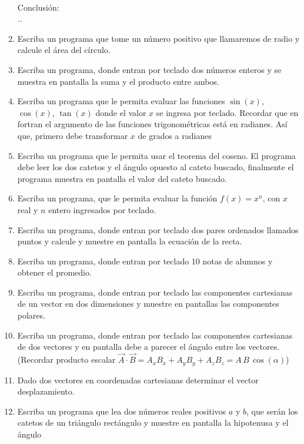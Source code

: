 \documentclass[11pt]{exam}
\begin{document}
\begin{enumerate}
\begin{minipage}{5cm}
\end{minipage}
\\

Conclusi\'on: \dotfill \\
..\dotfill
\item 
Escriba un programa que tome un  n\'umero positivo que llamaremos de radio  y calcule el \'area del c\'irculo.
\item Escriba un programa, donde entran por teclado dos n\'umeros enteros y se muestra en pantalla la suma
 y el producto entre ambos.
\item 
Escriba un programa que le permita evaluar las  funciones $\sin(x)$, $\cos(x)$, $\tan(x)$ 
donde el valor $x$ se ingresa por teclado. Recordar que en fortran el argumento de las funciones 
trigonom\'etricas est\'a en radianes.  As\'i que, primero debe transformar  $x$ de grados a radianes 
\item 
Escriba un programa que le permita usar el teorema del coseno. El programa debe leer los dos catetos y el
 \'angulo opuesto al cateto buscado, finalmente el programa muestra en pantalla el valor del cateto buscado.
\item Escriba un programa, que le permita evaluar la funci\'on $f(x)= x^n$, con $x$ real y $n$ entero ingresados  por teclado.
\item Escriba un programa, donde entran por teclado dos pares ordenados llamados puntos y calcule y muestre en pantalla
 la ecuaci\'on de la recta.
\item 
Escriba un programa, donde entran por teclado 10 notas de alumnos y obtener  el promedio.
\item Escriba un programa, donde entran por teclado las componentes cartesianas de un vector en 
dos dimensiones y muestre en pantallas las componentes polares.
\item 
Escriba un programa, donde entran por teclado las componentes cartesianas de dos vectores y
en pantalla debe a parecer el \'angulo entre los vectores. (Recordar producto escalar 
$\vec A \cdot \vec B=A_x B_x+A_y B_y+A_z B_z= A\, B\, \cos(\alpha)$)
\item 
Dado dos vectores en coordenadas cartesianas determinar el vector desplazamiento.
\item 
Escriba un programa que lea dos n\'umeros reales positivos $a$ y $b$,  que ser\'an los catetos de un
tri\'angulo rect\'angulo y muestre en pantalla la hipotenusa y el \'angulo
\end{enumerate}
%
\end{document}
